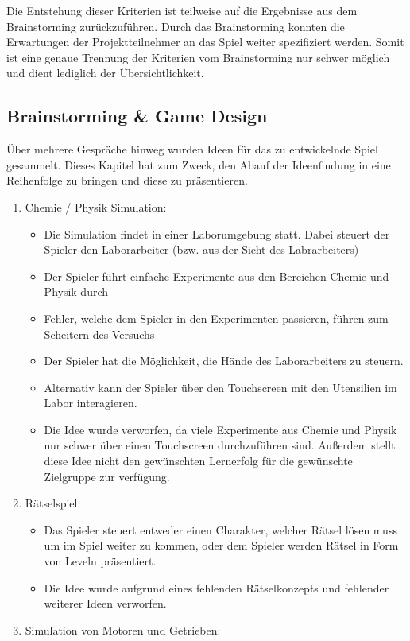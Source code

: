 	Die Entstehung dieser Kriterien ist teilweise auf die Ergebnisse aus dem Brainstorming zurückzuführen. Durch das Brainstorming konnten die Erwartungen der Projektteilnehmer an das Spiel weiter spezifiziert werden. Somit ist eine genaue Trennung der Kriterien vom Brainstorming nur schwer möglich und dient lediglich der Übersichtlichkeit.

\subsection{Brainstorming \& Game Design}\label{ssec:idee}
	Über mehrere Gespräche hinweg wurden Ideen für das zu entwickelnde Spiel gesammelt. Dieses Kapitel hat zum Zweck, den Abauf der Ideenfindung in eine Reihenfolge zu bringen und diese zu präsentieren.
	\begin{enumerate}
		\item{Chemie / Physik Simulation:}
		\begin{itemize}
			\item{Die Simulation findet in einer Laborumgebung statt. Dabei steuert der Spieler den Laborarbeiter (bzw. aus der Sicht des Labrarbeiters)}
			\item{Der Spieler führt einfache Experimente aus den Bereichen Chemie und Physik durch}
			\item{Fehler, welche dem Spieler in den Experimenten passieren, führen zum Scheitern des Versuchs}
			\item{Der Spieler hat die Möglichkeit, die Hände des Laborarbeiters zu steuern.}
			\item{Alternativ kann der Spieler über den Touchscreen mit den Utensilien im Labor interagieren.}
			\item{Die Idee wurde verworfen, da viele Experimente aus Chemie und Physik nur schwer über einen Touchscreen durchzuführen sind. Außerdem stellt diese Idee nicht den gewünschten Lernerfolg für die gewünschte Zielgruppe zur verfügung.}
		\end{itemize}
		\item{Rätselspiel:}
		\begin{itemize}
			\item{Das Spieler steuert entweder einen Charakter, welcher Rätsel lösen muss um im Spiel weiter zu kommen, oder dem Spieler werden Rätsel in Form von Leveln präsentiert.}
			\item{Die Idee wurde aufgrund eines fehlenden Rätselkonzepts und fehlender weiterer Ideen verworfen.}
		\end{itemize}
		\item{Simulation von Motoren und Getrieben:}

\end{enumerate}
